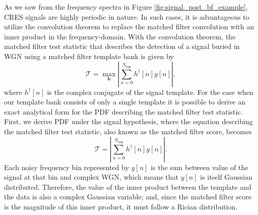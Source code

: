 As we saw from the frequency spectra in Figure \ref{fig:signal_post_bf_example}, CRES signals are highly periodic in nature. In such cases, it is advantageous to utilize the convolution theorem to replace the matched filter convolution with an inner product in the frequency-domain. With the convolution theorem, the matched filter test statistic that describes the detection of a signal buried in WGN using a matched filter template bank is given by
\begin{equation}
    \mathcal{T}=\max_{\mathbf{h}}\left|\sum_{n=0}^{N_\mathrm{bin}}h^\dagger[n]y[n]\right|,
    \label{eq:mf_test_stat}
\end{equation}
where $h^\dagger[n]$ is the complex conjugate of the signal template. For the case when our template bank consists of only a single template it is possible to derive an exact analytical form for the PDF describing the matched filter test statistic. First, we derive PDF under the signal hypothesis, where the equation describing the matched filter test statistic, also known as the matched filter score, becomes
\begin{equation}
    \mathcal{T}=\left|\sum_{n=0}^{N_\mathrm{bin}}h^\dagger[n]y[n]\right|.
    \label{eq:mf_inner_prod_1}
\end{equation}
Each noisy frequency bin represented by $y[n]$ is the sum between value of the signal at that bin and complex WGN, which means that $y[n]$ is itself Gaussian distributed. Therefore, the value of the inner product between the template and the data is also a complex Gaussian variable; and, since the matched filter score is the magnitude of this inner product, it must follow a Rician distribution.

